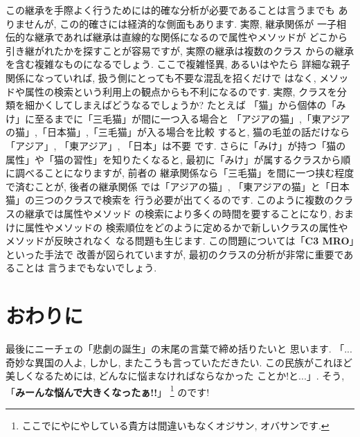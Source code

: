 この継承を手際よく行うためには的確な分析が必要であることは言うまでも
ありませんが, この的確さには経済的な側面もあります. 実際, 継承関係が
一子相伝的な継承であれば継承は直線的な関係になるので属性やメソッドが
どこから引き継がれたかを探すことが容易ですが, 実際の継承は複数のクラス
からの継承を含む複雑なものになるでしょう. ここで複雑怪異, あるいはやたら
詳細な親子関係になっていれば, 扱う側にとっても不要な混乱を招くだけで
はなく, メソッドや属性の検索という利用上の観点からも不利になるのです.
 実際, クラスを分類を細かくしてしまえばどうなるでしょうか?  たとえば
「猫」から個体の「みけ」に至るまでに「三毛猫」が間に一つ入る場合と
「アジアの猫」,「東アジアの猫」,「日本猫」,「三毛猫」が入る場合を比較
すると, 猫の毛並の話だけなら「アジア」, 「東アジア」, 「日本」は不要
です. さらに「みけ」が持つ「猫の属性」や「猫の習性」を知りたくなると,
 最初に「みけ」が属するクラスから順に調べることになりますが, 前者の
継承関係なら「三毛猫」を間に一つ挟む程度で済むことが, 後者の継承関係
では「アジアの猫」, 「東アジアの猫」と「日本猫」の三つのクラスで検索を
行う必要が出てくるのです. このように複数のクラスの継承では属性やメソッド
の検索により多くの時間を要することになり, おまけに属性やメソッドの
検索順位をどのように定めるかで新しいクラスの属性やメソッドが反映されなく
なる問題も生じます. この問題については「\textbf{C3 MRO}」といった手法で
改善が図られていますが, 最初のクラスの分析が非常に重要であることは
言うまでもないでしょう.

\section{おわりに}

最後にニーチェの「悲劇の誕生」\cite{悲劇の誕生}の末尾の言葉で締め括りたいと
思います. 「...奇妙な異国の人よ, しかし, またこうも言っていただきたい.
 この民族がこれほど美しくなるためには, どんなに悩まなければならなかった
ことか!と...」. そう, 「\textbf{みーんな悩んで大きくなったぁ!!}」\cite{野坂}
\footnote{ここでにやにやしている貴方は間違いもなくオジサン, オバサンです.}
のです!

